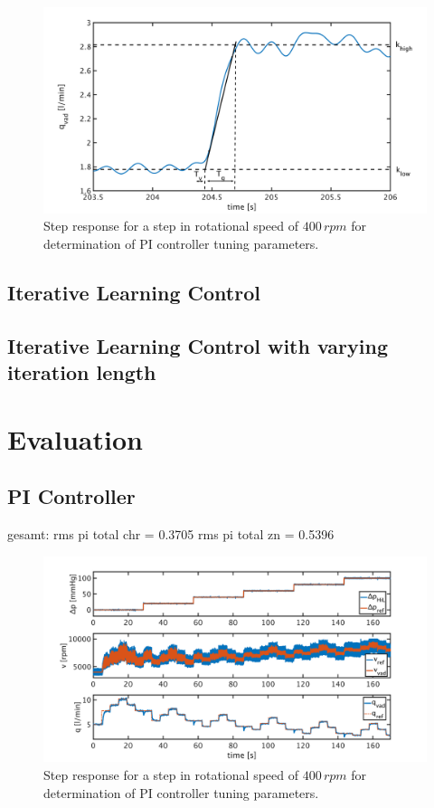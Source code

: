 \begin{figure}[ht]
  \centering
  \includegraphics[width=\textwidth]{images/chapt_5/param_calc_PI.pdf}
  \caption[Step response for determination of PI controller tuning parameters]{Step response for a step in rotational speed of $400\,rpm$ for determination of PI controller tuning parameters.}
  \label{fig:param_calc_PI}
\end{figure}

\subsection{Iterative Learning Control}

\subsection{Iterative Learning Control with varying iteration length}

\section{Evaluation}
\subsection{PI Controller}
gesamt:
rms pi total chr = 0.3705
rms pi total zn = 0.5396
\begin{figure}[ht]
  \centering
  \includegraphics[width=\textwidth]{images/chapt_5/pi_contr_chr.pdf}
  \caption[Step response for determination of PI controller tuning parameters]{Step response for a step in rotational speed of $400\,rpm$ for determination of PI controller tuning parameters.}
  \label{fig:pi_contr_chr}
\end{figure}

